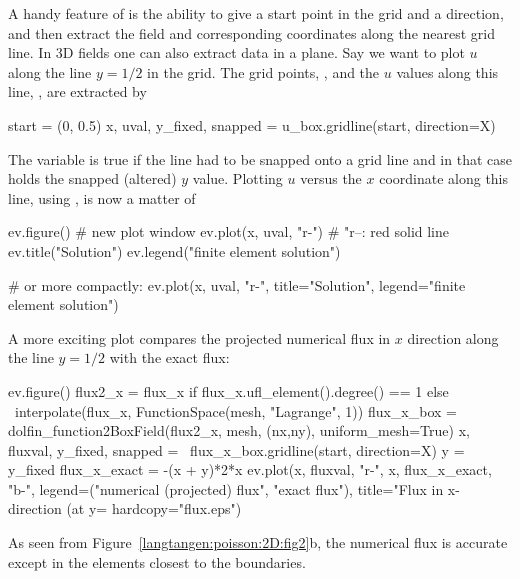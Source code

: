 A handy feature of  is the
ability to give a start point in the grid and a direction, and then
extract the field and corresponding coordinates along the nearest grid
line. In 3D fields one can also extract data in a plane.  Say we want
to plot $u$ along the line $y=1/2$ in the grid. The grid points,
, and the $u$ values along this line,
, are extracted by
\begin{python}
start = (0, 0.5)
x, uval, y_fixed, snapped = u_box.gridline(start, direction=X)
\end{python}
The variable  is true if the line had to be snapped onto a
grid line and in that case  holds the snapped
(altered) $y$ value.
Plotting $u$ versus the $x$ coordinate along this line, using
, is now a matter of
\begin{python}
ev.figure()  # new plot window
ev.plot(x, uval, "r-")  # "r--: red solid line
ev.title("Solution")
ev.legend("finite element solution")

# or more compactly:
ev.plot(x, uval, "r-", title="Solution",
        legend="finite element solution")
\end{python}

A more exciting plot compares the projected numerical flux in
$x$ direction along the
line $y=1/2$ with the exact flux:
\begin{python}
ev.figure()
flux2_x = flux_x if flux_x.ufl_element().degree() == 1 else \
    interpolate(flux_x, FunctionSpace(mesh, "Lagrange", 1))
flux_x_box = dolfin_function2BoxField(flux2_x, mesh, (nx,ny),
                                      uniform_mesh=True)
x, fluxval, y_fixed, snapped = \
      flux_x_box.gridline(start, direction=X)
y = y_fixed
flux_x_exact = -(x + y)*2*x
ev.plot(x, fluxval, "r-",
        x, flux_x_exact, "b-",
        legend=("numerical (projected) flux", "exact flux"),
        title="Flux in x-direction (at y=%
        hardcopy="flux.eps")
\end{python}
As seen from Figure~\ref{langtangen:poisson:2D:fig2}b, the numerical flux
is accurate except in the elements closest to the boundaries.

